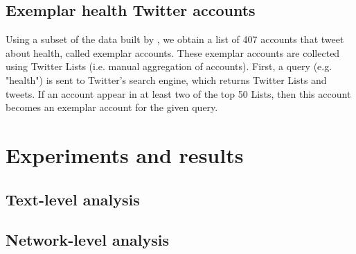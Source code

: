 \documentclass[letterpaper]{article}
\newcommand{\cut}[1]{}
\begin{document}
\subsection{Exemplar health Twitter accounts}

Using a subset of the data built by \cite{culotta16mining}, we obtain a list of 
407 accounts that tweet about health, called exemplar accounts. These exemplar accounts are collected using Twitter Lists (i.e. manual aggregation of accounts). First, a query (e.g. "health") is sent to Twitter's search engine, which returns Twitter Lists and tweets. If an account appear in at least two of the top 50 Lists, then this account becomes an exemplar account for the given query.

\section{Experiments and results}

\cut{
  - wordnet filter is subject to high false positive rate (e.g. must, cat, dog)
}

\subsection{Text-level analysis}

\cut {
  - most predictive features
  - most used categories
}

\subsection{Network-level analysis}






\end{document}
